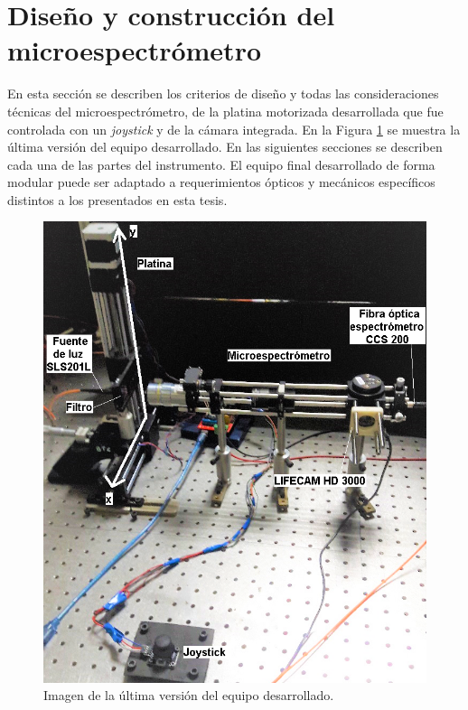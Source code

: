 \singlespacing
\section{Diseño y construcción del microespectrómetro}
\label{sec:montcontmsp}

\hspace{0.5cm}En esta sección se describen los criterios de diseño y todas las consideraciones técnicas del microespectrómetro, de la platina motorizada desarrollada que fue controlada con un \textit{joystick} y de la cámara integrada. En la Figura \ref{fig:presequipo} se muestra la última versión del equipo desarrollado. En las siguientes secciones se describen cada una de las partes del instrumento. El equipo final desarrollado de forma modular puede ser adaptado a requerimientos ópticos y mecánicos específicos distintos a los presentados en esta tesis. 
\begin{figure}[H]
	\centering
	\includegraphics[width=1.0\textwidth]{Figs/microespectrometro/presentacion_equipo.png}
	\caption{Imagen de la última versión del equipo desarrollado.}
	\label{fig:presequipo}
\end{figure}




